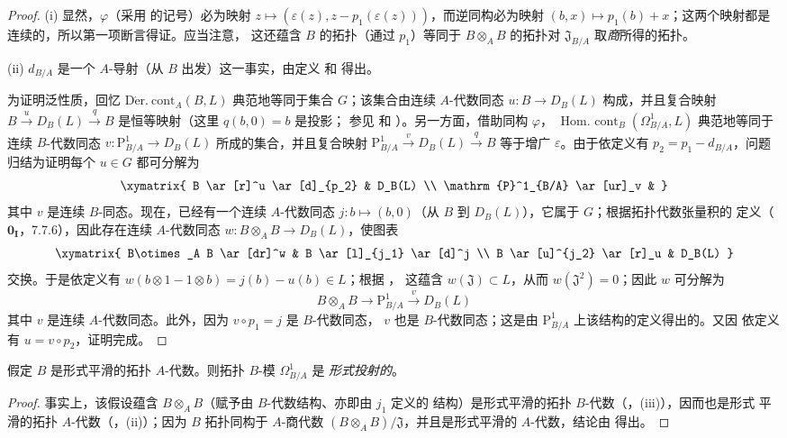 \begin{proof}
(i) 显然，$\varphi$（采用  的记号）必为映射
$z\mapsto(\varepsilon(z),z-p_1(\varepsilon(z)))$，而逆同构必为映射
$(b,x)\mapsto p_1(b)+x$；这两个映射都是连续的，所以第一项断言得证。应当注意，
这还蕴含 $B$ 的拓扑（通过 $p_1$）等同于 $B\otimes_A B$ 的拓扑对
$\mathfrak{J}_{B/A}$ 取\emph{商}所得的拓扑。

(ii) $d_{B/A}$ 是一个 $A$-导射（从 $B$ 出发）这一事实，由定义
 和  得出。

为证明泛性质，回忆 $\operatorname{D\acute{e}r.\ cont}_A(B,L)$ 典范地等同于集合
$G$；该集合由连续 $A$-代数同态 $u:B\to D_B(L)$ 构成，并且复合映射
$B\xrightarrow{u}D_B(L)\xrightarrow{q}B$ 是恒等映射（这里 $q(b,0)=b$ 是投影；
参见  和 ）。另一方面，借助同构 $\varphi$，
$\operatorname{Hom.\ cont}_B(\Omega^1_{B/A},L)$ 典范地等同于连续 $B$-代数同态
$v:\mathrm{P}^1_{B/A}\to D_B(L)$ 所成的集合，并且复合映射
$\mathrm{P}^1_{B/A}\xrightarrow{v}D_B(L)\xrightarrow{q}B$ 等于增广
$\varepsilon$。由于依定义有 $p_2=p_1-d_{B/A}$，问题归结为证明每个 $u\in G$
都可分解为
\[
\xymatrix{
  B \ar[r]^u \ar[d]_{p_2} & D_B(L) \\
  \mathrm{P}^1_{B/A} \ar[ur]_v &
}
\]
其中 $v$ 是连续 $B$-同态。现在，已经有一个连续 $A$-代数同态
$j:b\mapsto(b,0)$（从 $B$ 到 $D_B(L)$），它属于 $G$；根据拓扑代数张量积的
定义（$\mathbf{0_I}$，7.7.6），因此存在连续 $A$-代数同态
$w:B\otimes_A B\to D_B(L)$，使图表
\[
\xymatrix{
  B\otimes_A B \ar[dr]^w & B \ar[l]_{j_1} \ar[d]^j \\
  B \ar[u]^{j_2} \ar[r]_u & D_B(L)
}
\]
交换。于是依定义有
$w(b\otimes1-1\otimes b)=j(b)-u(b)\in L$；根据 ，
这蕴含 $w(\mathfrak{J})\subset L$，从而 $w(\mathfrak{J}^2)=0$；因此 $w$ 可分解为
\[
  B\otimes_A B\to\mathrm{P}^1_{B/A}\xrightarrow{v}D_B(L)
\]
其中 $v$ 是连续 $A$-代数同态。此外，因为 $v\circ p_1=j$ 是 $B$-代数同态，
$v$ 也是 $B$-代数同态；这是由 $\mathrm{P}^1_{B/A}$ 上该结构的定义得出的。又因
依定义有 $u=v\circ p_2$，证明完成。
\end{proof}

\begin{theorem}[20.4.9]
\label{0.20.4.9-fr}
假定 $B$ 是形式平滑的拓扑 $A$-代数。则拓扑 $B$-模 $\Omega^1_{B/A}$ 是
\emph{形式投射的}。
\end{theorem}

\begin{proof}
事实上，该假设蕴含 $B\otimes_A B$（赋予由 $B$-代数结构、亦即由 $j_1$ 定义的
结构）是形式平滑的拓扑 $B$-代数（，(iii)），因而也是形式
平滑的拓扑 $A$-代数（，(ii)）；因为 $B$ 拓扑同构于
$A$-商代数 $(B\otimes_A B)/\mathfrak{J}$，并且是形式平滑的 $A$-代数，结论由
 得出。
\end{proof}

